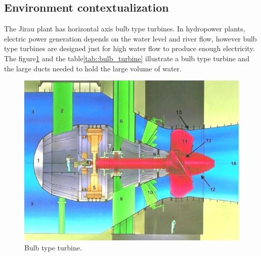 \subsection{Environment contextualization}\label{sec::desc_contex}

The Jirau plant has horizontal axis bulb type turbines. In hydropower
plants, electric power generation depends on the water level and river flow,
however bulb type turbines are designed just for high water flow to produce
enough electricity. The figure\ref{fig::bulb_turbine} and the
table\ref{tab::bulb_turbine} illustrate a bulb type turbine and the large
ducts needed to hold the large volume of water.
 
\begin{figure}[h!]	
	\includegraphics[width=\columnwidth]{figs/intro/bulb_turbine2}
	\caption{Bulb type turbine.}
	\label{fig::bulb_turbine}
\end{figure}

